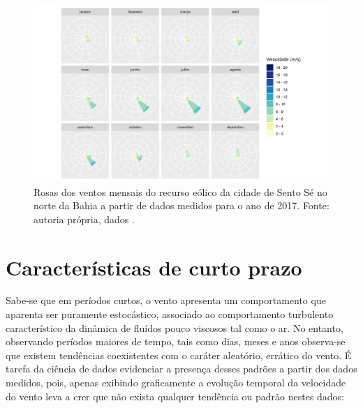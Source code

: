 \documentclass[
	12pt,				%
	openright,			%
	oneside,			%
	a4paper,			%
	english,			%
	french,				%
	spanish,			%
	brazil				%
	]{abntex2}
\begin{document}
\begin{figure}[h]
    \centering
  	\hspace*{-1.4cm}   
	\includegraphics[scale=1]{windrose_monthly}
	\caption{Rosas dos ventos mensais do recurso eólico da cidade de Sento Sé no norte da Bahia a partir de dados medidos para o ano de 2017. Fonte: autoria própria, dados \cite{era5}.}
\end{figure}
\FloatBarrier

\chapter{Características de curto prazo}

Sabe-se que em períodos curtos, o vento apresenta um comportamento que aparenta ser puramente estocástico, associado ao comportamento turbulento característico da dinâmica de fluídos pouco viscosos tal como o ar. No entanto, observando períodos maiores de tempo, tais como dias, meses e anos observa-se que existem tendências coexistentes com o caráter aleatório, errático do vento. É tarefa da ciência de dados evidenciar a presença desses padrões a partir dos dados medidos, pois, apenas exibindo graficamente a evolução temporal da velocidade do vento leva a crer que não exista qualquer tendência ou padrão nestes dados:
\end{document}
